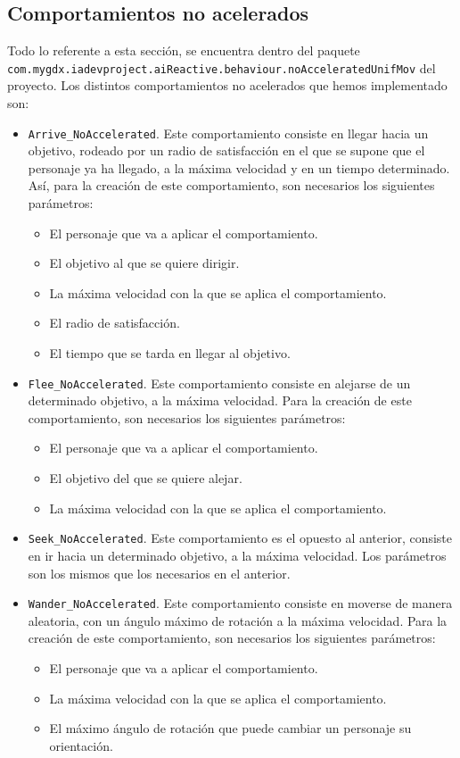 \subsection{Comportamientos no acelerados}
Todo lo referente a esta sección, se encuentra dentro del paquete \\ \texttt{com.mygdx.iadevproject.aiReactive.behaviour.noAcceleratedUnifMov} del proyecto. Los distintos comportamientos no acelerados que hemos implementado son:
\begin{itemize}
 \item \texttt{Arrive\_NoAccelerated}. Este comportamiento consiste en llegar hacia un objetivo, rodeado por un radio de satisfacción en el que se supone que el personaje ya ha llegado, a la máxima velocidad y en un tiempo determinado. Así, para la creación de este comportamiento, son necesarios los siguientes parámetros:
 \begin{itemize}
  \item El personaje que va a aplicar el comportamiento.
  \item El objetivo al que se quiere dirigir.
  \item La máxima velocidad con la que se aplica el comportamiento.
  \item El radio de satisfacción.
  \item El tiempo que se tarda en llegar al objetivo.
 \end{itemize}
 
 \item \texttt{Flee\_NoAccelerated}. Este comportamiento consiste en alejarse de un determinado objetivo, a la máxima velocidad. Para la creación de este comportamiento, son necesarios los siguientes parámetros:
 \begin{itemize}
  \item El personaje que va a aplicar el comportamiento.
  \item El objetivo del que se quiere alejar.
  \item La máxima velocidad con la que se aplica el comportamiento.
 \end{itemize}
 
 \item \texttt{Seek\_NoAccelerated}. Este comportamiento es el opuesto al anterior, consiste en ir hacia un determinado objetivo, a la máxima velocidad. Los parámetros son los mismos que los necesarios en el anterior. 
 
 \item \texttt{Wander\_NoAccelerated}. Este comportamiento consiste en moverse de manera aleatoria, con un ángulo máximo de rotación a la máxima velocidad. Para la creación de este comportamiento, son necesarios los siguientes parámetros:
 \begin{itemize}
  \item El personaje que va a aplicar el comportamiento.
  \item La máxima velocidad con la que se aplica el comportamiento.
  \item El máximo ángulo de rotación que puede cambiar un personaje su orientación.
 \end{itemize}
\end{itemize}

